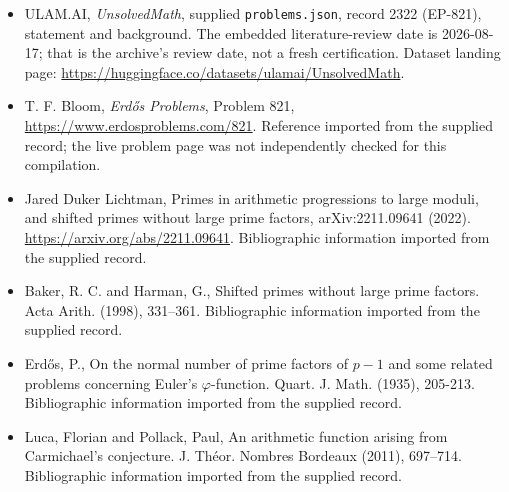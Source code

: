 \documentclass[11pt,a4paper]{article}
\begin{document}
{\small

\begin{itemize}

\item[\hypertarget{source:2322:1}{S1}] ULAM.AI, \emph{UnsolvedMath}, supplied \texttt{problems.json}, record 2322 (EP-821), statement and background. The embedded literature-review date is 2026-08-17; that is the archive’s review date, not a fresh certification. Dataset landing page: \url{https://huggingface.co/datasets/ulamai/UnsolvedMath}.

\item[\hypertarget{source:2322:2}{S2}] T. F. Bloom, \emph{Erdős Problems}, Problem 821, \url{https://www.erdosproblems.com/821}. Reference imported from the supplied record; the live problem page was not independently checked for this compilation.

\item[\hypertarget{source:2322:3}{S3}] Jared Duker Lichtman, Primes in arithmetic progressions to large moduli, and shifted primes without large prime factors, arXiv:2211.09641 (2022). \url{https://arxiv.org/abs/2211.09641}. Bibliographic information imported from the supplied record.

\item[\hypertarget{source:2322:4}{S4}] Baker, R. C. and Harman, G., Shifted primes without large prime factors. Acta Arith. (1998), 331--361. Bibliographic information imported from the supplied record.

\item[\hypertarget{source:2322:5}{S5}] Erd\H{o}s, P., On the normal number of prime factors of $p-1$ and some related problems concerning Euler's $\varphi$-function. Quart. J. Math. (1935), 205-213. Bibliographic information imported from the supplied record.

\item[\hypertarget{source:2322:6}{S6}] Luca, Florian and Pollack, Paul, An arithmetic function arising from {C}armichael's conjecture. J. Th\'{e}or. Nombres Bordeaux (2011), 697--714. Bibliographic information imported from the supplied record.

\end{itemize}

}

\label{end:2322}
\end{document}
